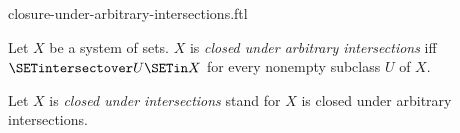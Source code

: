 \documentclass{naproche-library}
\begin{document}
\begin{smodule}[title=Closure Under Arbitrary Intersections]{closure-under-arbitrary-intersections.ftl}

\begin{definition}[forthel,id=FOUNDATIONS_14_2369621166391296]
  Let $X$ be a system of sets.
  $X$ is \emph{closed under arbitrary intersections} iff $\SETintersectover U \SETin X$ for every nonempty subclass $U$ of $X$.

  Let $X$ is \emph{closed under intersections} stand for $X$ is closed under arbitrary intersections.
\end{definition}
\end{smodule}
\end{document}
